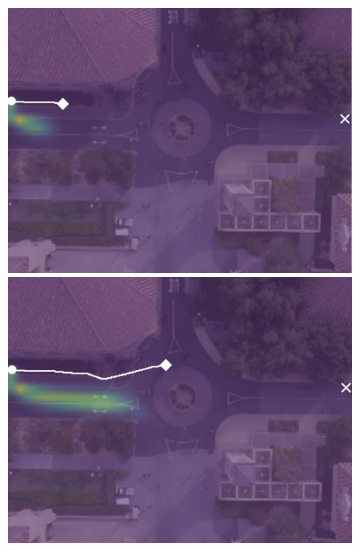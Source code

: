 \documentclass[letterpaper,10pt,conference]{ieeetran}
\begin{document}
\begin{figure}[t!]
\begin{subfigure}[t]{0.48\textwidth}
	\vspace{0.1cm}
	\begin{minipage}[c]{0.47cm}
	\end{minipage}
	\begin{minipage}[c]{0.3\linewidth}
		\includegraphics[width=\linewidth]{./figures/comparison/kit_death_1_2_t=70.jpg}
	\end{minipage}
	\begin{minipage}[c]{0.3\linewidth}
		\includegraphics[width=\linewidth]{./figures/comparison/kit_death_1_2_t=250.jpg}
	\end{minipage}
	\begin{minipage}[c]{0.3\linewidth}

\end{minipage}
\end{subfigure}
\end{figure}
\end{document}
